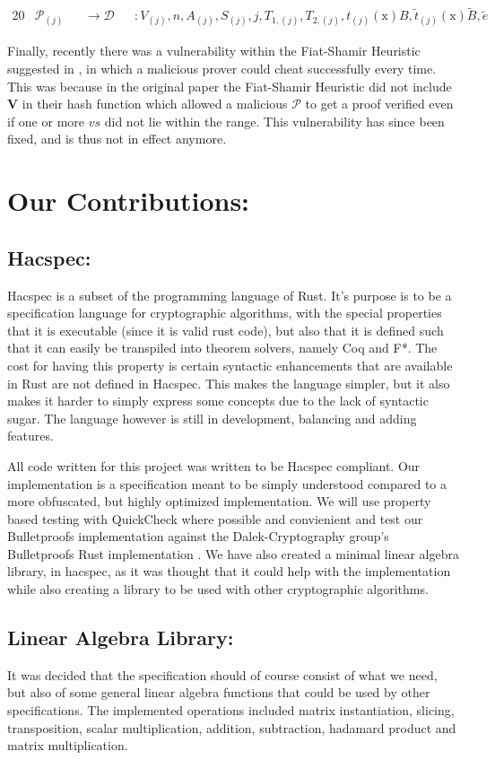 \documentclass{article}
\newcommand{\eq}[1]{\begin{alignat*}{20}#1\end{alignat*}}
\renewcommand{\vec}[1]{\boldsymbol{#1}}
\newcommand{\ran}[1]{\mathrm{#1}}
\renewcommand{\P}{\mathcal{P}}
\newcommand{\D}{\mathcal{D}}
\newcommand{\tB}{\widetilde{B}}
\renewcommand{\tt}{\widetilde{t}}
\begin{document}
\eq{
	&\P_{(j)} &&\rightarrow \D &&: V_{(j)}, n, A_{(j)}, S_{(j)}, j, T_{1, (j)}, T_{2,(j)}, t_{(j)}(\ran{x})B, \tt_{(j)}(\ran{x})\tB, \widetilde{e}
}

Finally, recently there was a vulnerability within the Fiat-Shamir
Heuristic suggested in \cite{bulletproofs}, in which a malicious
prover could cheat successfully every time. This was because in the
original paper the Fiat-Shamir Heuristic did not include $\vec{V}$
in their hash function which allowed a malicious $\P$ to get a proof
verified even if one or more $vs$ did not lie within the range. This
vulnerability has since been fixed, and is thus not in effect anymore.

\section{Our Contributions:}

\subsection{Hacspec:} \label{Hacspec}

Hacspec is a subset of the programming language of Rust. It's purpose is
to be a specification language for cryptographic algorithms, with the
special properties that it is executable (since it is valid rust code),
but also that it is defined such that it can easily be transpiled
into theorem solvers, namely Coq and F*. The cost for having this
property is certain syntactic enhancements that are available in Rust
are not defined in Hacspec. This makes the language simpler, but it
also makes it harder to simply express some concepts due to the lack
of syntactic sugar. The language however is still in development,
balancing and adding features.

All code written for this project was written to be Hacspec
compliant. Our implementation is a specification meant to be simply
understood compared to a more obfuscated, but highly optimized
implementation. We will use property based testing with QuickCheck
\cite{quickcheck} where possible and convienient and test our
Bulletproofs implementation against the Dalek-Cryptography group's
Bulletproofs Rust implementation \cite{dalek}.  We have also created
a minimal linear algebra library, in hacspec, as it was thought that
it could help with the implementation while also creating a library
to be used with other cryptographic algorithms.

\subsection{Linear Algebra Library:}
It was decided that the specification should of course consist of what
we need, but also of some general linear algebra functions that could
be used by other specifications. The implemented operations included
matrix instantiation, slicing, transposition, scalar multiplication,
addition, subtraction, hadamard product and matrix multiplication.
\end{document}
